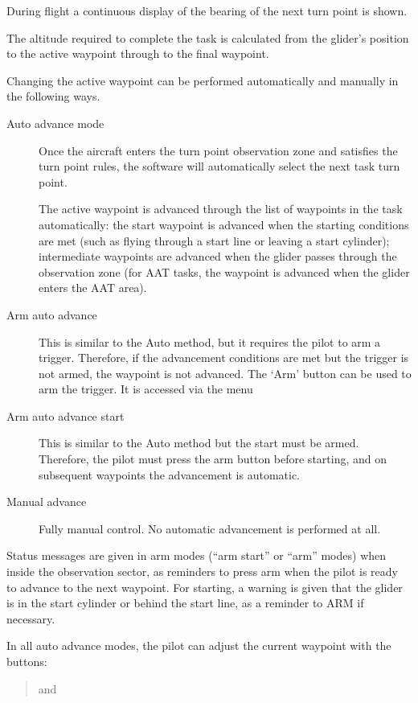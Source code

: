\documentclass[a4paper,12pt]{refrep}
\begin{document}
During flight a continuous display of the bearing of the next turn
point is shown.

The altitude required to complete the task is calculated from the
glider's position to the active waypoint through to the final
waypoint.

Changing the active waypoint can be performed automatically and
manually in the following ways.
\begin{description}
\item[Auto advance mode]
Once the aircraft enters the turn point observation zone and satisfies
the turn point rules, the software will automatically select the next
task turn point.

The active waypoint is advanced through the list of waypoints in the
task automatically: the start waypoint is advanced when the starting
conditions are met (such as flying through a start line or leaving a
start cylinder); intermediate waypoints are advanced when the glider
passes through the observation zone (for AAT tasks, the waypoint is
advanced when the glider enters the AAT area).
\item[Arm auto advance]
This is similar to the Auto method, but it requires the pilot to arm a
trigger.  Therefore, if the advancement conditions are met but the
trigger is not armed, the waypoint is not advanced.  The `Arm' button can be 
used to arm the trigger.  It is accessed via the menu
\begin{quote}
\blink{}
\end{quote}
\item[Arm auto advance start]
This is similar to the Auto method but the start must be armed.
Therefore, the pilot must press the arm button before starting, and on
subsequent waypoints the advancement is automatic.
\item[Manual advance]
Fully manual control.  No automatic advancement is performed at all.
\end{description}  

Status messages are given in arm modes (``arm start'' or ``arm''
modes) when inside the observation sector, as reminders to press arm
when the pilot is ready to advance to the next waypoint.
For starting, a warning is given that the glider is in the start
cylinder or behind the start line, as a reminder to ARM if necessary.

In all auto advance modes, the pilot can adjust the current waypoint
with the buttons:

\begin{quote}
\blink{} and \blink{}
\end{quote}
\end{document}
